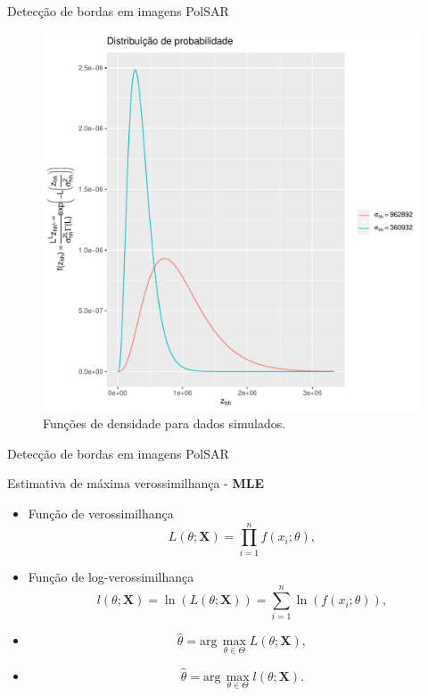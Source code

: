 \documentclass[10pt]{beamer}
\begin{document}
\begin{frame}{Detecção de bordas em imagens PolSAR}
\begin{figure}[hbt]
	\centering
  \includegraphics[scale = 0.4]{grafico_pdf_nhfc_2014_sigma_hh.pdf}
	\caption{Funções de densidade para dados simulados.}
\end{figure}  
\end{frame}
\begin{frame}{Detecção de bordas em imagens PolSAR}
  \begin{alertblock}{Estimativa de máxima verossimilhança - \textbf{MLE}}
  \begin{itemize}
\item Função de verossimilhança
\begin{equation}
    L(\theta;\mathbf{X}) = \prod_{i=1}^{n}f(x_i;\theta), 
\end{equation}
\item Função de log-verossimilhança
\begin{equation}
	l(\theta;\mathbf{X})= \ln(L(\theta;\mathbf{X})) = \sum_{i=1}^{n}\ln(f(x_i;\theta)),
\end{equation}
\item 
\begin{equation}
    \widehat{\theta}= \text{arg}\,\max\limits_{\theta\in\Theta}L(\theta;\mathbf{X}),
\end{equation}
\item
\begin{equation}
    \widehat{\theta}= \text{arg}\,\max\limits_{\theta\in\Theta}l(\theta;\mathbf{X}).
\end{equation}
\end{itemize}
\end{alertblock}
\end{frame}
\end{document}
